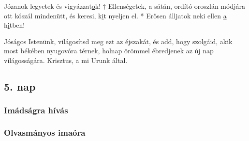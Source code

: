 \documentclass[twoside]{article}
\begin{document}
Józanok legyetek és vigyázzat\underline{o}k! † Ellenségetek, a sátán, ordító oroszlán módjára ott
kószál mindenütt, és keresi, k\underline{i}t nyeljen el. * Erősen álljatok neki ellen \underline{a}
h\underline{i}tben!

Jóságos Istenünk, világosítsd meg ezt az éjszakát, és add, hogy szolgáid, akik most békében nyugovóra térnek, holnap örömmel ébredjenek az új nap világosságára. Krisztus, a mi Urunk által.

\subsection*{5. nap}

\subsubsection*{Imádságra hívás}

\subsubsection*{Olvasmányos imaóra}
\end{document}
